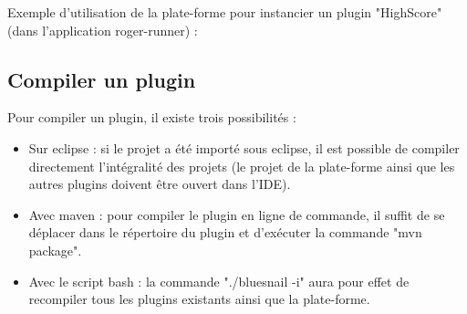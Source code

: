     Exemple d'utilisation de la plate-forme pour instancier un plugin "HighScore" (dans l'application roger-runner) :
    
    

\subsection{Compiler un plugin}
    Pour compiler un plugin, il existe trois possibilités :
    \begin{itemize}
        \item Sur eclipse : si le projet a été importé sous eclipse, il est possible de compiler directement l'intégralité des projets (le projet de la plate-forme ainsi que les autres plugins doivent être ouvert dans l'IDE).
        \item Avec maven : pour compiler le plugin en ligne de commande, il suffit de se déplacer dans le répertoire du plugin et d'exécuter la commande "mvn package".
        \item Avec le script bash : la commande "./bluesnail -i" aura pour effet de recompiler tous les plugins existants ainsi que la plate-forme.
    \end{itemize}
